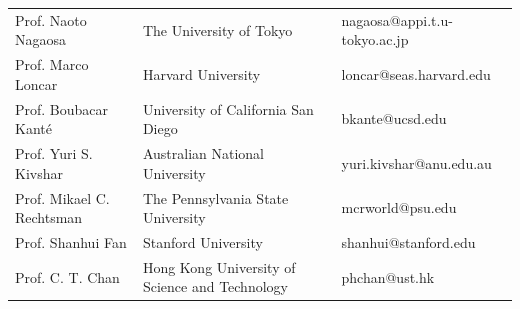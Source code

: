 \documentclass[a4paper,12pt]{article}
\begin{document}
\begin{spacing}{1.0}
\footnotesize{
\begin{flushleft}
\begin{tabular}{lll}
  Prof. Naoto Nagaosa  & The University of Tokyo  & nagaosa@appi.t.u-tokyo.ac.jp \\
  Prof. Marco Loncar & Harvard University  & loncar@seas.harvard.edu \\
  Prof. Boubacar Kant\'{e} & University of California San Diego   & bkante@ucsd.edu \\
  Prof. Yuri S. Kivshar & Australian National University & yuri.kivshar@anu.edu.au \\
  Prof. Mikael C. Rechtsman \quad\quad  & The Pennsylvania State University & mcrworld@psu.edu \\
  Prof. Shanhui Fan & Stanford University & shanhui@stanford.edu \\
  Prof. C. T. Chan & Hong Kong University of Science and Technology \quad\quad  & phchan@ust.hk \\
\end{tabular}
\end{flushleft}}

\end{spacing}
\end{document}

